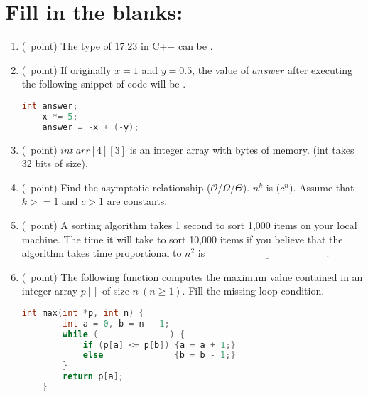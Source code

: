 \documentclass[14pt]{article}
\begin{document}
\section{Fill in the blanks:}
\begin{enumerate}[label=\alph*)]
    \item (\textonequarter\ point) The type of 17.23 in C++ can be \underline{\hspace{10cm}}.
    
    \item (\textonequarter\ point) If originally $x = 1$ and $y = 0.5$, the value of $answer$ after executing the following snippet of code will be \underline{\hspace{5em}}.
    \begin{lstlisting}[language=C++, title={Part (b)}]
    int answer;
    x *= 5;
    answer = -x + (-y);
    \end{lstlisting}
    
    \item (\textonequarter\ point) $int\ arr[4][3]$ is an integer array with \underline{\hspace{5cm}} bytes of memory. (int takes 32 bits of size).
    
    \item (\textonequarter\ point) Find the asymptotic relationship ($\mathcal{O}$/$\Omega$/$\Theta$). $n^k$ is \underline{\hspace{1cm}}($c^n$). Assume that $k >= 1$ and $c > 1$ are constants.
    
    \item (\textonequarter\ point) A sorting algorithm takes 1 second to sort 1,000 items on your local machine. The time it will take to sort 10,000 items if you believe that the algorithm takes time proportional to $n^2$ is $\underline{\hspace{5cm}}$.
    
    \item (\textonequarter\ point)
    The following function computes the maximum value contained in an integer array $p[]$ of size $n\ (n \geq 1)$. Fill the missing loop condition.
    \begin{lstlisting}[language=C++, title={Part (f)}]
    int max(int *p, int n) {
        int a = 0, b = n - 1;
        while (______________) {
            if (p[a] <= p[b]) {a = a + 1;}
            else              {b = b - 1;}
        }
        return p[a];
    }
    \end{lstlisting}
    
\end{enumerate}
\end{document}
